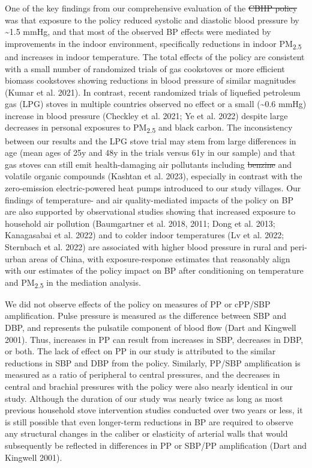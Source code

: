\documentclass[
  letterpaper,
  DIV=11,
  numbers=noendperiod]{scrartcl}
\makeatletter
\providecommand{\DIFadd}[1]{{\protect\color{blue}\uwave{#1}}} %
\providecommand{\DIFdel}[1]{{\protect\color{red}\sout{#1}}} %
\providecommand{\DIFaddbegin}{} %
\providecommand{\DIFaddend}{} %
\providecommand{\DIFdelbegin}{} %
\providecommand{\DIFdelend}{} %
\newcommand{\DIFscaledelfig}{0.5}
\newlength{\DIFdelgraphicswidth} %
\newlength{\DIFdelgraphicsheight} %
\newcommand{\DIFaddincludegraphics}[2][]{{\color{blue}\fbox{\DIFOincludegraphics[#1]{#2}}}} %
\newcommand{\DIFdelincludegraphics}[2][]{%
\sbox{\DIFdelgraphicsbox}{\DIFOincludegraphics[#1]{#2}}%
\settoboxwidth{\DIFdelgraphicswidth}{\DIFdelgraphicsbox} %
\settoboxtotalheight{\DIFdelgraphicsheight}{\DIFdelgraphicsbox} %
\scalebox{\DIFscaledelfig}{%
\parbox[b]{\DIFdelgraphicswidth}{\usebox{\DIFdelgraphicsbox}\\[-\baselineskip] \rule{\DIFdelgraphicswidth}{0em}}\llap{\resizebox{\DIFdelgraphicswidth}{\DIFdelgraphicsheight}{%
\setlength{\unitlength}{\DIFdelgraphicswidth}%
\begin{picture}(1,1)%
\thicklines\linethickness{2pt} %
{\color[rgb]{1,0,0}\put(0,0){\framebox(1,1){}}}%
{\color[rgb]{1,0,0}\put(0,0){\line( 1,1){1}}}%
{\color[rgb]{1,0,0}\put(0,1){\line(1,-1){1}}}%
\end{picture}%
}\hspace*{3pt}}} %
} %
\DeclareRobustCommand{\DIFaddbegin}{\DIFOaddbegin \let\includegraphics\DIFaddincludegraphics} %
\DeclareRobustCommand{\DIFaddend}{\DIFOaddend \let\includegraphics\DIFOincludegraphics} %
\DeclareRobustCommand{\DIFdelbegin}{\DIFOdelbegin \let\includegraphics\DIFdelincludegraphics} %
\DeclareRobustCommand{\DIFdelend}{\DIFOaddend \let\includegraphics\DIFOincludegraphics} %
\let\sout@orig\sout %
\renewcommand{\sout}[1]{\ifmmode\text{\sout@orig{\ensuremath{#1}}}\else\sout@orig{#1}\fi} %
\makeatother
\begin{document}
One of the key findings from our comprehensive evaluation of the \DIFdelbegin \DIFdel{CBHP
policy }\DIFdelend \DIFaddbegin \DIFadd{CHP }\DIFaddend was
that exposure to the policy reduced systolic and diastolic blood
pressure by \textasciitilde1.5 mmHg, and that most of the observed BP
effects were mediated by improvements in the indoor environment,
specifically reductions in indoor PM\textsubscript{2.5} and increases in
indoor temperature. The total effects of the policy are consistent with
a small number of randomized trials of gas cookstoves or more efficient
biomass cookstoves showing reductions in blood pressure of similar
magnitudes (Kumar et al. 2021). In contrast, recent randomized trials of
liquefied petroleum gas (LPG) stoves in multiple countries observed no
effect or a small (\textasciitilde0.6 mmHg) increase in blood pressure
(Checkley et al. 2021; Ye et al. 2022) despite large decreases in
personal exposures to PM\textsubscript{2.5} and black carbon. The
inconsistency between our results and the LPG stove trial may stem from
large differences in age (mean ages of 25y and 48y in the trials versus
61y in our sample) and that gas stoves can still emit health-damaging
air pollutants including \DIFdelbegin \DIFdel{benzine }\DIFdelend \DIFaddbegin \DIFadd{benzene }\DIFaddend and volatile organic compounds (Kashtan
et al. 2023), especially in contrast with the zero-emission
electric-powered heat pumps introduced to our study villages. Our
findings of temperature- and air quality-mediated impacts of the policy
on BP are also supported by observational studies showing that increased
exposure to household air pollution (Baumgartner et al. 2018, 2011; Dong
et al. 2013; Kanagasabai et al. 2022) and to colder indoor temperatures
(Lv et al. 2022; Sternbach et al. 2022) are associated with higher blood
pressure in rural and peri-urban areas of China, with exposure-response
estimates that reasonably align with our estimates of the policy impact
on BP after conditioning on temperature and PM\textsubscript{2.5} in the
mediation analysis.

We did not observe effects of the policy on measures of PP or cPP/SBP
amplification. Pulse pressure is measured as the difference between SBP
and DBP, and represents the pulsatile component of blood flow (Dart and
Kingwell 2001). Thus, increases in PP can result from increases in SBP,
decreases in DBP, or both. The lack of effect on PP in our study is
attributed to the similar reductions in SBP and DBP from the policy.
Similarly, PP/SBP amplification is measured as a ratio of peripheral to
central pressures, and the decreases in central and brachial pressures
with the policy were also nearly identical in our study. Although the
duration of our study was nearly twice as long as most previous
household stove intervention studies conducted over two years or less,
it is still possible that even longer-term reductions in BP are required
to observe any structural changes in the caliber or elasticity of
arterial walls that would subsequently be reflected in differences in PP
or SBP/PP amplification (Dart and Kingwell 2001).
\end{document}
